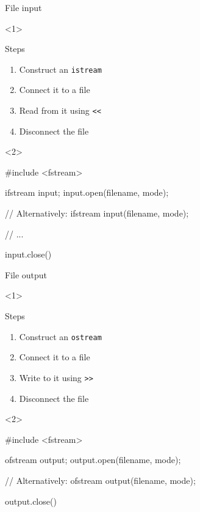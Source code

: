 \begin{frame}[fragile]{File input}
    \begin{onlyenv}<1>
        \begin{block}{Steps}
            \begin{enumerate}
                \item Construct an \texttt{istream}
                \item Connect it to a file
                \item Read from it using \texttt{<<}
                \item Disconnect the file
            \end{enumerate}
        \end{block}
    \end{onlyenv}
    \begin{onlyenv}<2>
        \begin{cpp}
            #include <fstream>

            ifstream input;
            input.open(filename, mode);

            // Alternatively:
            ifstream input(filename, mode);

            // ...

            input.close()
        \end{cpp}
    \end{onlyenv}
\end{frame}

\begin{frame}[fragile]{File output}
    \begin{onlyenv}<1>
        \begin{block}{Steps}
            \begin{enumerate}
                \item Construct an \texttt{ostream}
                \item Connect it to a file
                \item Write to it using \texttt{>>}
                \item Disconnect the file
            \end{enumerate}
        \end{block}
    \end{onlyenv}
    \begin{onlyenv}<2>
        \begin{cpp}
            #include <fstream>

            ofstream output;
            output.open(filename, mode);

            // Alternatively:
            ofstream output(filename, mode);

            output.close()
        \end{cpp}
    \end{onlyenv}
\end{frame}

